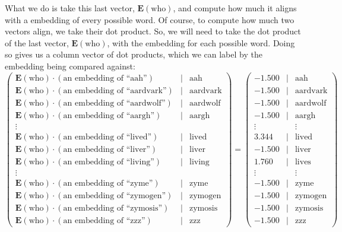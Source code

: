 \documentclass{article}
\begin{document}
What we do is take this last vector, $\mathbf{E}(\text{who})$, and compute how much it aligns with a embedding of every possible word. Of course, to compute how much two vectors align, we take their dot product. So, we will need to take the dot product of the last vector, $\mathbf{E}(\text{who})$, with the embedding for each possible word. Doing so gives us a column vector of dot products, which we can label by the embedding being compared against:
$$
\begin{pmatrix}
	\mathbf{E}(\text{who}) \cdot (\text{an embedding of ``aah''}) & | & \text{aah} \\
	\mathbf{E}(\text{who}) \cdot (\text{an embedding of ``aardvark''}) & | & \text{aardvark} \\
	\mathbf{E}(\text{who}) \cdot (\text{an embedding of ``aardwolf''}) & | & \text{aardwolf} \\
	\mathbf{E}(\text{who}) \cdot (\text{an embedding of ``aargh''}) & | & \text{aargh} \\
	\vdots \\
	\mathbf{E}(\text{who}) \cdot (\text{an embedding of ``lived''}) & | & \text{lived} \\
	\mathbf{E}(\text{who}) \cdot (\text{an embedding of ``liver''}) & | & \text{liver} \\
	\mathbf{E}(\text{who}) \cdot (\text{an embedding of ``living''}) & | & \text{living} \\
	\vdots \\
	\mathbf{E}(\text{who}) \cdot (\text{an embedding of ``zyme''}) & | & \text{zyme} \\
	\mathbf{E}(\text{who}) \cdot (\text{an embedding of ``zymogen''}) & | & \text{zymogen} \\
	\mathbf{E}(\text{who}) \cdot (\text{an embedding of ``zymosis''}) & | & \text{zymosis} \\
	\mathbf{E}(\text{who}) \cdot (\text{an embedding of ``zzz''}) & | & \text{zzz}
\end{pmatrix}
=
\begin{pmatrix}
    -1.500 & | & \text{aah} \\
    -1.500 & | & \text{aardvark} \\
    -1.500 & | & \text{aardwolf} \\
    -1.500 & | & \text{aargh} \\
    \vdots &   & \vdots \\
     3.344 & | & \text{lived} \\
    -1.500 & | & \text{liver} \\
     1.760 & | & \text{lives} \\
    \vdots &   & \vdots \\
    -1.500 & | & \text{zyme} \\
    -1.500 & | & \text{zymogen} \\
    -1.500 & | & \text{zymosis} \\
    -1.500 & | & \text{zzz}
\end{pmatrix}
$$
\end{document}
